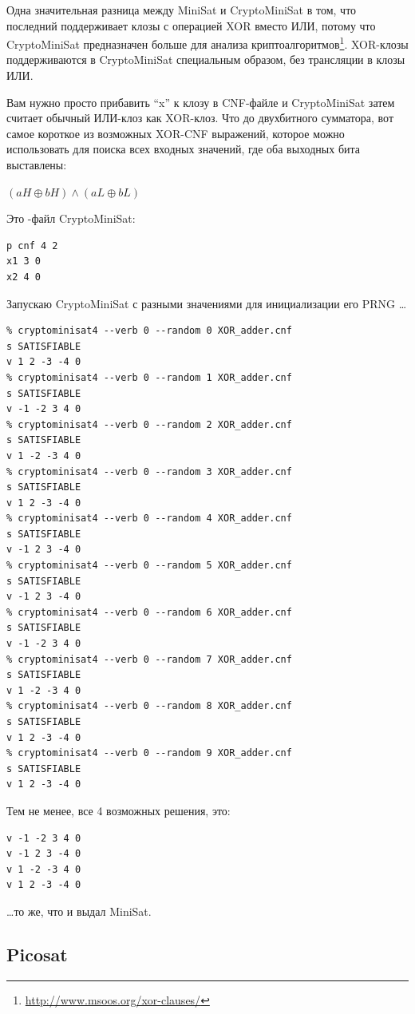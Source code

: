 Одна значительная разница между MiniSat и CryptoMiniSat в том, что последний поддерживает
клозы с операцией XOR вместо ИЛИ,
потому что CryptoMiniSat предназначен больше для анализа криптоалгоритмов\footnote{\url{http://www.msoos.org/xor-clauses/}}.
XOR-клозы поддерживаются в CryptoMiniSat специальным образом, без трансляции в клозы ИЛИ.

Вам нужно просто прибавить ``x'' к клозу в \ac{CNF}-файле и CryptoMiniSat затем считает обычный ИЛИ-клоз как XOR-клоз.
Что до двухбитного сумматора, вот самое короткое из возможных XOR-CNF выражений, которое можно использовать
для поиска всех входных значений, где оба выходных бита выставлены:

$(aH \oplus bH) \wedge (aL \oplus bL)$

Это -файл CryptoMiniSat:

\begin{lstlisting}
p cnf 4 2
x1 3 0
x2 4 0
\end{lstlisting}

Запускаю CryptoMiniSat с разными значениями для инициализации его \ac{PRNG} \dots

\begin{lstlisting}
% cryptominisat4 --verb 0 --random 0 XOR_adder.cnf
s SATISFIABLE
v 1 2 -3 -4 0
% cryptominisat4 --verb 0 --random 1 XOR_adder.cnf
s SATISFIABLE
v -1 -2 3 4 0
% cryptominisat4 --verb 0 --random 2 XOR_adder.cnf
s SATISFIABLE
v 1 -2 -3 4 0
% cryptominisat4 --verb 0 --random 3 XOR_adder.cnf
s SATISFIABLE
v 1 2 -3 -4 0
% cryptominisat4 --verb 0 --random 4 XOR_adder.cnf
s SATISFIABLE
v -1 2 3 -4 0
% cryptominisat4 --verb 0 --random 5 XOR_adder.cnf
s SATISFIABLE
v -1 2 3 -4 0
% cryptominisat4 --verb 0 --random 6 XOR_adder.cnf
s SATISFIABLE
v -1 -2 3 4 0
% cryptominisat4 --verb 0 --random 7 XOR_adder.cnf
s SATISFIABLE
v 1 -2 -3 4 0
% cryptominisat4 --verb 0 --random 8 XOR_adder.cnf
s SATISFIABLE
v 1 2 -3 -4 0
% cryptominisat4 --verb 0 --random 9 XOR_adder.cnf
s SATISFIABLE
v 1 2 -3 -4 0
\end{lstlisting}

Тем не менее, все 4 возможных решения, это:

\begin{lstlisting}
v -1 -2 3 4 0
v -1 2 3 -4 0
v 1 -2 -3 4 0
v 1 2 -3 -4 0
\end{lstlisting}

\dots то же, что и выдал MiniSat.

\subsection{Picosat}

